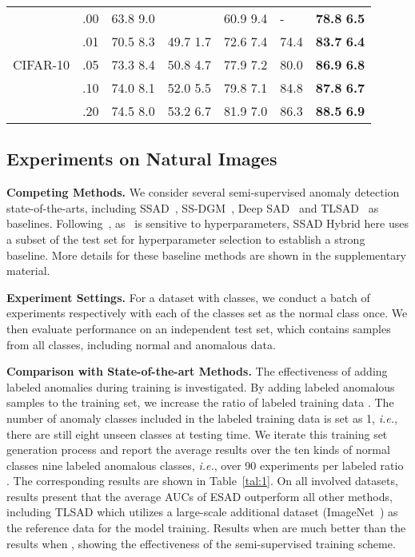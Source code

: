 \documentclass{bmvc2k}
\begin{document}
\begin{table}[t]
{\begin{tabular}{C{1.3cm}C{0.6cm}C{2.2cm}C{1.7cm}C{1.8cm}C{1.1cm}C{1.6cm}}
 & .00 & 63.8  9.0 & & 60.9  9.4 & - & \textbf{78.8}  \textbf{6.5}\\
  & .01 & 70.5  8.3 & 49.7  1.7 & 72.6  7.4 & 74.4 & \textbf{83.7}  \textbf{6.4}\\
 CIFAR-10 & .05 & 73.3  8.4 & 50.8  4.7 & 77.9  7.2 & 80.0 & \textbf{86.9}  \textbf{6.8} \\
 & .10 & 74.0  8.1 & 52.0  5.5 & 79.8  7.1 & 84.8 & \textbf{87.8}  \textbf{6.7} \\
 & .20 & 74.5  8.0 & 53.2  6.7 & 81.9  7.0 & 86.3 & \textbf{88.5}  \textbf{6.9} \\
\bottomrule
\end{tabular}}
\vspace{-12pt}
\end{table}

\subsection{Experiments on Natural Images}
\vspace{-3pt}
\noindent\textbf{Competing Methods.}
We consider several semi-supervised anomaly detection state-of-the-arts, including SSAD~\cite{gornitz2013toward}, SS-DGM~\cite{kingma2014semi}, Deep SAD~\cite{SAD} and TLSAD~\cite{TLSAD} as baselines.
Following~\cite{SAD}, as~\cite{gornitz2013toward} is sensitive to hyperparameters, SSAD Hybrid here uses a subset  of the test set for hyperparameter selection to establish a strong baseline.
More details for these baseline methods are shown in the supplementary material.

\noindent\textbf{Experiment Settings.}
For a dataset with  classes, we conduct a batch of  experiments respectively with each of the  classes set as the normal class once. We then evaluate performance on an independent test set, which contains samples from all classes, including normal and anomalous data. 

\noindent\textbf{Comparison with State-of-the-art Methods.}
The effectiveness of adding labeled anomalies during training is investigated. By adding labeled anomalous samples  to the training set, we increase the ratio of labeled training data . The number of anomaly classes included in the labeled training data is set as 1, \emph{i.e.}, there are still eight unseen classes at testing time. We iterate this training set generation process and report the average results over the ten kinds of normal classes  nine labeled anomalous classes, \emph{i.e.}, over 90 experiments per labeled ratio . The corresponding results are shown in Table~\ref{tal:1}. On all involved datasets, results present that the average AUCs of ESAD outperform all other methods, including TLSAD which utilizes a large-scale additional dataset (ImageNet~\cite{russakovsky2015imagenet}) as the reference data for the model training. Results when  are much better than the results when , showing the effectiveness of the semi-supervised training scheme.
\end{document}
